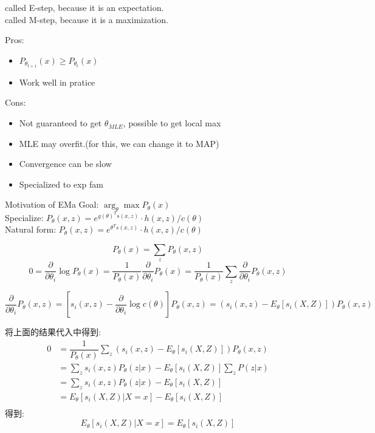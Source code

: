 \documentclass{article}
\begin{document}
\noindent
called E-step, because it is an expectation.\\
called M-step, because it is a maximization.

Pros:
\begin{itemize}
\item $P_{\theta_{t+1}}(x) \geq P_{\theta_t}(x)$
\item Work well in pratice
\end{itemize}

Cons:
\begin{itemize}
\item Not guaranteed to get $\theta_{MLE}$, possible to get local max
\item MLE may overfit.(for this, we can change it to MAP)
\item Convergence can be slow
\item Specialized to exp fam
\end{itemize}

Motivation of EMa
\noindent
Goal: $\arg_\theta \max P_\theta(x)$\\
Specialize: $P_\theta(x,z) = e^{g(\theta)^T s(x,z)} \cdot h(x,z) / c(\theta)$\\
Natural form: $P_\theta(x,z) = e^{\theta^T s(x,z)} \cdot h(x,z) / c(\theta)$

$$P_\theta(x) = \sum_z P_\theta(x,z)$$
$$
0 
= \dfrac{\partial}{\partial \theta_i} \log P_\theta(x) 
= \dfrac{1}{P_\theta(x)} \dfrac{\partial }{\partial \theta_i} P_\theta(x)
= \dfrac{1}{P_\theta(x)} \sum_z \dfrac{\partial }{\partial \theta_i} P_\theta(x,z)
$$

\begin{equation}
\dfrac{\partial }{\partial \theta_i} P_\theta(x,z)
= [s_i(x,z) - \dfrac{\partial }{\partial \theta_i} \log c(\theta)] P_\theta(x,z)
= (s_i(x,z) - E_\theta[s_i(X,Z)]) P_\theta(x,z)
\end{equation}

将上面的结果代入\lasteq 中得到:
$$
\begin{aligned}
0 
& = \dfrac{1}{P_\theta(x)} \sum_z (s_i(x,z) - E_\theta[s_i(X,Z)]) P_\theta(x,z) \\
& = \sum_z s_i(x,z)P_\theta(z|x) - E_\theta[s_i(X,Z)] \sum_z P(z|x) \\
& = \sum_z s_i(x,z)P_\theta(z|x) - E_\theta[s_i(X,Z)] \\
& = E_\theta[s_i(X,Z)|X=x] - E_\theta[s_i(X,Z)] \\
\end{aligned}
$$
得到:
$$ E_\theta[s_i(X,Z)|X=x] = E_\theta[s_i(X,Z)] $$
\end{document}
